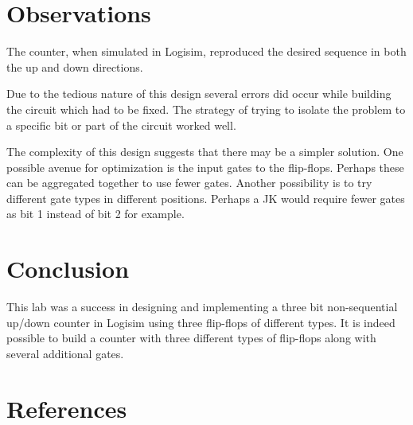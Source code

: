 \documentclass[12pt]{article}
\begin{document}


\section{Observations}

\samepage
The counter, when simulated in Logisim, reproduced the desired sequence
in both the up and down directions.

Due to the tedious nature of this design several errors did
occur while building the circuit which had to be fixed.
The strategy of trying to isolate the problem to a specific bit
or part of the circuit worked well.

The complexity of this design suggests that there may be a simpler
solution.
One possible avenue for optimization is the input gates to the flip-flops.
Perhaps these can be aggregated together to use fewer gates.
Another possibility is to try different gate types in different positions.
Perhaps a JK would require fewer gates as bit 1 instead of bit 2 for example.


\section{Conclusion}

This lab was a success in designing and implementing a
three bit non-sequential up/down counter in Logisim
using three flip-flops of different types.
It is indeed possible to build a counter with three different
types of flip-flops along with several additional gates.



\renewcommand*{\refname}{\vspace{-8mm}}
\section{References}


\end{document}

